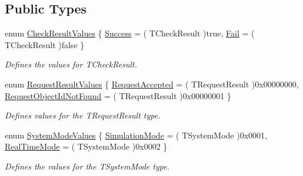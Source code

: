 \subsection*{Public Types}
\begin{DoxyCompactItemize}
\item 
enum \hyperlink{class_terra_swarm_1_1_asynchronous_1_1_client_connection_response_a6ca5be4e8bbd731c78f132f1c36513ab}{Check\-Result\-Values} \{ \hyperlink{class_terra_swarm_1_1_asynchronous_1_1_client_connection_response_a6ca5be4e8bbd731c78f132f1c36513abab6f5e3d2684a7900eaf26759bca7985a}{Success} = ( T\-Check\-Result )true, 
\hyperlink{class_terra_swarm_1_1_asynchronous_1_1_client_connection_response_a6ca5be4e8bbd731c78f132f1c36513aba3e6ded9f7aac9629d82cf4c50d232cf0}{Fail} = ( T\-Check\-Result )false
 \}
\begin{DoxyCompactList}\small\item\em Defines the values for T\-Check\-Result. \end{DoxyCompactList}\item 
enum \hyperlink{class_terra_swarm_1_1_asynchronous_1_1_client_connection_response_a0ebeb46e785ebdd94d1b7e2c9bad80e8}{Request\-Result\-Values} \{ \hyperlink{class_terra_swarm_1_1_asynchronous_1_1_client_connection_response_a0ebeb46e785ebdd94d1b7e2c9bad80e8a81d9cf33ed428b0b13e67f28fc7aca73}{Request\-Accepted} = ( T\-Request\-Result )0x00000000, 
\hyperlink{class_terra_swarm_1_1_asynchronous_1_1_client_connection_response_a0ebeb46e785ebdd94d1b7e2c9bad80e8aea62f4e9889f66d001662d6fa7bea4eb}{Request\-Object\-Id\-Not\-Found} = ( T\-Request\-Result )0x00000001
 \}
\begin{DoxyCompactList}\small\item\em Defines values for the T\-Request\-Result type. \end{DoxyCompactList}\item 
enum \hyperlink{class_terra_swarm_1_1_asynchronous_1_1_client_connection_response_a980f1fa3c9f50c7013f2c2f2d7d6043c}{System\-Mode\-Values} \{ \hyperlink{class_terra_swarm_1_1_asynchronous_1_1_client_connection_response_a980f1fa3c9f50c7013f2c2f2d7d6043ca5d65d9ac052a2eb8917de303ebbeb913}{Simulation\-Mode} = ( T\-System\-Mode )0x0001, 
\hyperlink{class_terra_swarm_1_1_asynchronous_1_1_client_connection_response_a980f1fa3c9f50c7013f2c2f2d7d6043cadc0d1643e730abaef6c00b5cb62005e9}{Real\-Time\-Mode} = ( T\-System\-Mode )0x0002
 \}
\begin{DoxyCompactList}\small\item\em Defines the values for the T\-System\-Mode type. \end{DoxyCompactList}\item 

\end{DoxyCompactItemize}
